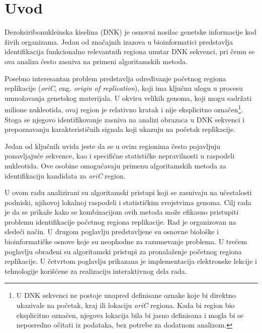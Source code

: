 \documentclass[12pt,oneside]{memoir}
\begin{document}

\frontmatter
\naslovna
\komisija
{}
\apstrakt
\tableofcontents*

\mainmatter

\chapter{Uvod}
Dezoksiribonukleinska kiselina (DNK) je osnovni nosilac genetske informacije kod živih organizama. Jedan od značajnih izazova u bioinformatici predstavlja identifikacija funkcionalno relevantnih regiona unutar DNK sekvenci, pri čemu se ova analiza često zasniva na primeni algoritamskih metoda.

Posebno interesantan problem predstavlja određivanje početnog regiona replikacije (\textit{oriC}, eng. \textit{origin of replication}), koji ima ključnu ulogu u procesu umnožavanja genetskog materijala. U okviru velikih genoma, koji mogu sadržati milione nukleotida, ovaj region je relativno kratak i nije eksplicitno označen\footnote{U DNK sekvenci ne postoje unapred definisane oznake koje bi direktno ukazivale na početak, kraj ili lokaciju \textit{oriC} regiona. Kada bi region bio eksplicitno označen, njegova lokacija bila bi jasno definisana i mogla bi se neposredno očitati iz podataka, bez potrebe za dodatnom analizom.}. Stoga se njegovo identifikovanje zasniva na analizi obrazaca u DNK sekvenci i prepoznavanju karakterističnih signala koji ukazuju na početak replikacije.

Jedan od ključnih uvida jeste da se u ovim regionima često pojavljuju ponavljajuće sekvence, kao i specifične statističke nepravilnosti u raspodeli nukleotida. Ove osobine omogućavaju primenu algoritamskih metoda za identifikaciju kandidata za \textit{oriC} region.

U ovom radu analizirani su algoritamski pristupi koji se zasnivaju na učestalosti podniski, njihovoj lokalnoj raspodeli i statističkim svojstvima genoma. Cilj rada je da se prikaže kako se kombinacijom ovih metoda može efikasno pristupiti problemu identifikacije početnog regiona replikacije. Rad je organizovan na sledeći način. U drugom poglavlju predstavljene su osnovne biološke i bioinformatičke osnove koje su neophodne za razumevanje problema. U trećem poglavlju obrađeni su algoritamski pristupi za pronalaženje početnog regiona replikacije. U četvrtom poglavlju prikazana je implementacija elektronske lekcije i tehnologije korišćene za realizaciju interaktivnog dela rada.
\end{document}
